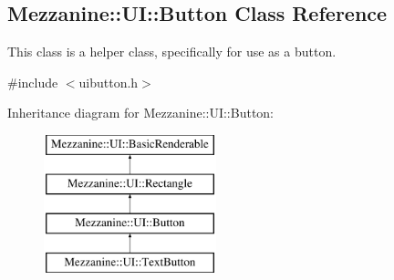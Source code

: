\hypertarget{classMezzanine_1_1UI_1_1Button}{
\subsection{Mezzanine::UI::Button Class Reference}
\label{classMezzanine_1_1UI_1_1Button}
}


This class is a helper class, specifically for use as a button.  




{\ttfamily \#include $<$uibutton.h$>$}

Inheritance diagram for Mezzanine::UI::Button:\begin{figure}[H]
\begin{center}
\leavevmode
\includegraphics[height=4.000000cm]{classMezzanine_1_1UI_1_1Button}
\end{center}
\end{figure}
